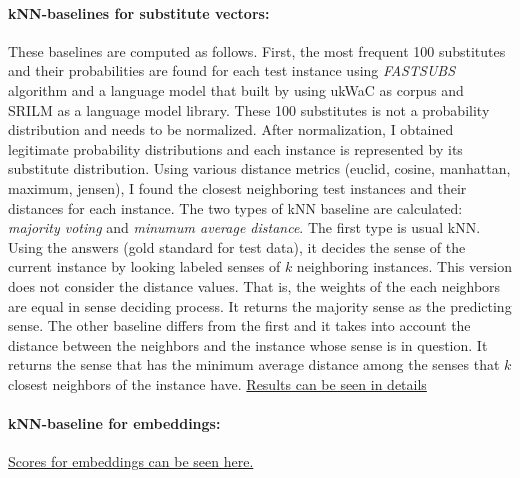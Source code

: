 \paragraph{kNN-baselines for substitute vectors:} These baselines are computed as follows. First, the most frequent 100 substitutes and their probabilities are found for each test instance using \emph{FASTSUBS} algorithm \cite{fastsubs} and a language model that built by using ukWaC \cite{ukWaC} as corpus and SRILM \cite{stolcke02srilm} as a language model library. These 100 substitutes is not a probability distribution and needs to be normalized. After normalization, I obtained legitimate probability distributions and each instance is represented by its substitute distribution. Using various distance metrics (euclid, cosine, manhattan, maximum, jensen), I found the closest neighboring test instances and their distances for each instance. The two types of kNN baseline are calculated: \emph{majority voting} and \emph{minumum average distance}. The first type is usual kNN. Using the answers (gold standard for test data), it decides the sense of the current instance by looking labeled senses of $k$ neighboring instances. This version does not consider the distance values. That is, the weights of the each neighbors are equal in sense deciding process. It returns the majority sense as the predicting sense. The other baseline differs from the first and it takes into account the distance between the neighbors and the instance whose sense is in question. It returns the sense that has the minimum average distance among the senses that $k$ closest neighbors of the instance have. \href{http://goo.gl/ofm4cW}{Results can be seen in details} 

\paragraph{kNN-baseline for embeddings:} \href{link}{Scores for embeddings can be seen here.}

